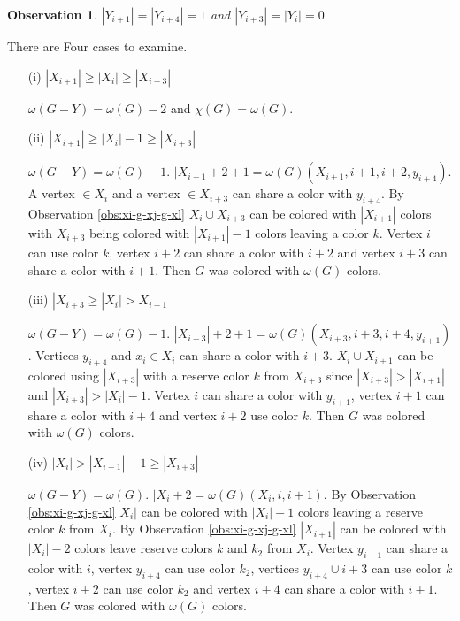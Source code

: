 \documentclass[12pt]{article}
\newtheorem{Observation}[Theorem]{Observation}
\begin{document}
\begin{Observation}\label{obs:yi1-yi4} 
$|Y_{i+1}| = |Y_{i+4}| = 1$ and $|Y_{i+3}| = |Y_{i}| = 0$
\end{Observation}
 There are Four cases to examine.
	\begin{itemize}
	\item[(i)]
		$|X_{i+1}| \geq |X_i| \geq |X_{i+3}|$

		$\omega(G - Y) = \omega(G) - 2$ and $\chi(G) = \omega(G)$.

	\item[(ii)]
		$|X_{i+1}| \geq |X_i| - 1 \geq |X_{i+3}|$

		$\omega(G - Y) = \omega(G) - 1$. $|X_{i+1} + 2 + 1 = \omega(G) (X_{i+1}, i+1, i+2, y_{i+4})$. A vertex $\in X_i$ and a vertex $\in X_{i+3}$ can share a color with $y_{i+4}$. By Observation \ref{obs:xi-g-xj-g-xl} $X_i \cup X_{i+3}$ can be colored with $|X_{i+1}|$ colors with $X_{i+3}$ being colored with $|X_{i+1}| -1 $ colors leaving a color $k$. Vertex $i$ can use color $k$, vertex $i+2$ can share a color with $i+2$ and vertex $i+3$ can share a color with $i+1$. Then $G$ was colored with $\omega(G)$ colors.

	\item[(iii)]
		$|X_{i+3} \geq |X_{i}| > X_{i+1}$

		$\omega(G - Y) = \omega(G) - 1$. $|X_{i+3}| + 2 +1 = \omega(G) (X_{i+3}, i+3, i+4, y_{i+1})$. Vertices $y_{i+4}$ and $x_i \in X_i$ can share a color with $i+3$. $X_{i} \cup X_{i+1}$ can be colored using $|X_{i+3}|$ with a reserve color $k$ from $X_{i+3}$ since $|X_{i+3}| > |X_{i+1}|$ and $|X_{i+3}| > |X_i| - 1$. Vertex $i$ can share a color with $y_{i+1}$, vertex $i+1$ can share a color with $i+4$ and vertex $i+2$ use color $k$. Then $G$ was colored with $\omega(G)$ colors.

	\item[(iv)]
		$|X_{i}| > |X_{i+1}| - 1 \geq |X_{i+3}|$

		$\omega(G - Y) = \omega(G)$. $|X_{i} +2 = \omega(G) (X_{i}, i, i+1)$. By Observation \ref{obs:xi-g-xj-g-xl} $X_i|$ can be colored with $|X_i| - 1$ colors leaving a reserve color $k$ from $X_{i}$. By Observation \ref{obs:xi-g-xj-g-xl} $|X_{i+1}|$ can be colored with $|X_i| -2 $ colors leave reserve colors $k$ and $k_2$ from $X_{i}$. Vertex $y_{i+1}$ can share a color with $i$, vertex $y_{i+4}$ can use color $k_2$, vertices $y_{i+4} \cup i+3$ can use color $k$, vertex $i+2$ can use color $k_2$ and vertex $i+4$ can share a color with $i+1$. Then $G$ was colored with $\omega(G)$ colors.
	\end{itemize}
\end{document}

